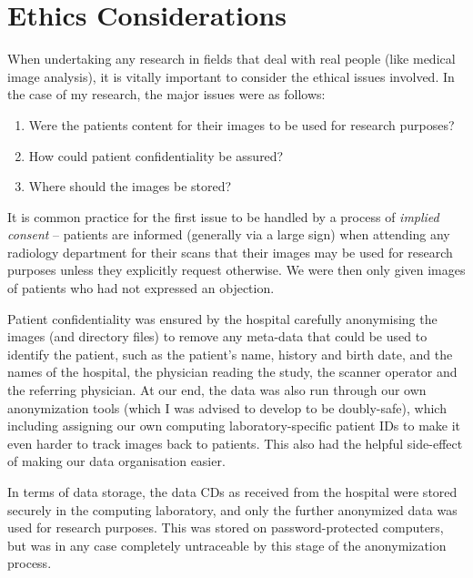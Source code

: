 \chapter{Ethics Considerations}

When undertaking any research in fields that deal with real people (like medical image analysis), it is vitally important to consider the ethical issues involved. In the case of my research, the major issues were as follows:
%
\begin{enumerate}

\item Were the patients content for their images to be used for research purposes?
\item How could patient confidentiality be assured?
\item Where should the images be stored?

\end{enumerate}
%
It is common practice for the first issue to be handled by a process of \emph{implied consent} -- patients are informed (generally via a large sign) when attending any radiology department for their scans that their images may be used for research purposes unless they explicitly request otherwise. We were then only given images of patients who had not expressed an objection.

Patient confidentiality was ensured by the hospital carefully anonymising the images (and directory files) to remove any meta-data that could be used to identify the patient, such as the patient's name, history and birth date, and the names of the hospital, the physician reading the study, the scanner operator and the referring physician. At our end, the data was also run through our own anonymization tools (which I was advised to develop to be doubly-safe), which including assigning our own computing laboratory-specific patient IDs to make it even harder to track images back to patients. This also had the helpful side-effect of making our data organisation easier.

In terms of data storage, the data CDs as received from the hospital were stored securely in the computing laboratory, and only the further anonymized data was used for research purposes. This was stored on password-protected computers, but was in any case completely untraceable by this stage of the anonymization process.
